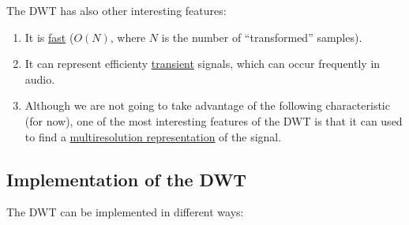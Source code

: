The DWT has also other interesting features:
\begin{enumerate}
\item It is
  \href{https://en.wikipedia.org/wiki/Discrete_wavelet_transform#Time_complexity}{fast}
  ($O(N)$, where $N$ is the number of ``transformed'' samples).
\item It can represent efficienty
  \href{https://en.wikipedia.org/wiki/Transient_(oscillation)}{transient}
  signals, which can occur frequently in audio.
\item Although we are not going to take advantage of the following
  characteristic (for now), one of the most interesting features of
  the DWT is that it can used to find a
  \href{https://en.wikipedia.org/wiki/Multiresolution_analysis}{multiresolution
    representation} of the signal.
\end{enumerate}


\subsection{Implementation of the DWT}

The DWT can be implemented in different ways:

